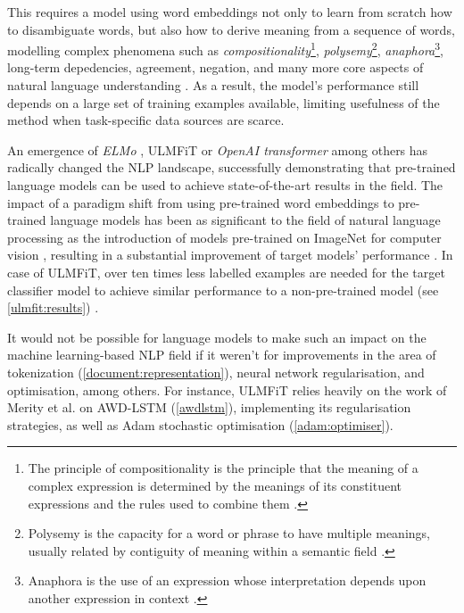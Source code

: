 This requires a model using word embeddings not only to learn from scratch how to disambiguate words, but also how to derive meaning from a sequence of words, modelling complex phenomena such as \emph{compositionality}\footnote{The principle of compositionality is the principle that the meaning of a complex expression is determined by the meanings of its constituent expressions and the rules used to combine them \cite{wiki:compositionality}.}, \emph{polysemy}\footnote{Polysemy is the capacity for a word or phrase to have multiple meanings, usually related by contiguity of meaning within a semantic field \cite{wiki:polysemy}.}, \emph{anaphora}\footnote{Anaphora is the use of an expression whose interpretation depends upon another expression in context \cite{wiki:anaphora}.}, long-term depedencies, agreement, negation, and many more core aspects of natural language understanding \cite{ruder:nlpimagenetmoment}. As a result, the model's performance still depends on a large set of training examples available, limiting usefulness of the method when task-specific data sources are scarce.

An emergence of \emph{ELMo} \cite{peters:elmo}, ULMFiT \cite{ulmfit} or \emph{OpenAI transformer} \cite{openai:transformer} among others has radically changed the NLP landscape, successfully demonstrating that pre-trained language models can be used to achieve state-of-the-art results in the field. The impact of a paradigm shift from using pre-trained word embeddings to pre-trained language models has been as significant to the field of natural language processing as the introduction of models pre-trained on ImageNet \cite{imagenet:dataset} for computer vision \cite{ruder:nlpimagenetmoment}, resulting in a substantial improvement of target models' performance \cite{henaff:contrastivepredictivecoding,state_of_nlp_2019}. In case of ULMFiT, over ten times less labelled examples are needed for the target classifier model to achieve similar performance to a non-pre-trained model (see \autoref{ulmfit:results}) \cite{ulmfit}.

It would not be possible for language models to make such an impact on the machine learning-based NLP field if it weren't for improvements in the area of tokenization (\autoref{document:representation}), neural network regularisation, and optimisation, among others. For instance, ULMFiT relies heavily on the work of Merity et al. on AWD-LSTM (\autoref{awdlstm}), implementing its regularisation strategies, as well as Adam stochastic optimisation (\autoref{adam:optimiser}).


